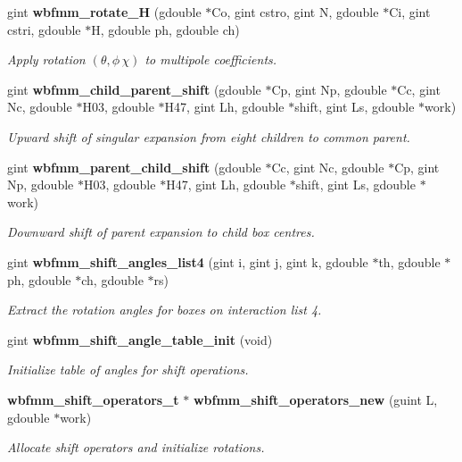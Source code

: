 \begin{DoxyCompactItemize}
gint \textbf{ wbfmm\+\_\+rotate\+\_\+H} (gdouble $\ast$Co, gint cstro, gint N, gdouble $\ast$Ci, gint cstri, gdouble $\ast$H, gdouble ph, gdouble ch)
\begin{DoxyCompactList}\small\item\em Apply rotation $(\theta,\phi\,\chi)$ to multipole coefficients. \end{DoxyCompactList}\item 
gint \textbf{ wbfmm\+\_\+child\+\_\+parent\+\_\+shift} (gdouble $\ast$Cp, gint Np, gdouble $\ast$Cc, gint Nc, gdouble $\ast$H03, gdouble $\ast$H47, gint Lh, gdouble $\ast$shift, gint Ls, gdouble $\ast$work)
\begin{DoxyCompactList}\small\item\em Upward shift of singular expansion from eight children to common parent. \end{DoxyCompactList}\item 
gint \textbf{ wbfmm\+\_\+parent\+\_\+child\+\_\+shift} (gdouble $\ast$Cc, gint Nc, gdouble $\ast$Cp, gint Np, gdouble $\ast$H03, gdouble $\ast$H47, gint Lh, gdouble $\ast$shift, gint Ls, gdouble $\ast$work)
\begin{DoxyCompactList}\small\item\em Downward shift of parent expansion to child box centres. \end{DoxyCompactList}\item 
gint \textbf{ wbfmm\+\_\+shift\+\_\+angles\+\_\+list4} (gint i, gint j, gint k, gdouble $\ast$th, gdouble $\ast$ph, gdouble $\ast$ch, gdouble $\ast$rs)
\begin{DoxyCompactList}\small\item\em Extract the rotation angles for boxes on interaction list 4. \end{DoxyCompactList}\item 
gint \textbf{ wbfmm\+\_\+shift\+\_\+angle\+\_\+table\+\_\+init} (void)
\begin{DoxyCompactList}\small\item\em Initialize table of angles for shift operations. \end{DoxyCompactList}\item 
\textbf{ wbfmm\+\_\+shift\+\_\+operators\+\_\+t} $\ast$ \textbf{ wbfmm\+\_\+shift\+\_\+operators\+\_\+new} (guint L, gdouble $\ast$work)
\begin{DoxyCompactList}\small\item\em Allocate shift operators and initialize rotations. \end{DoxyCompactList}\item 

\end{DoxyCompactItemize}
